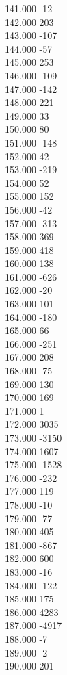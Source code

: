 { 141.000	-12 \\
 142.000	203 \\
 143.000	-107 \\
 144.000	-57 \\
 145.000	253 \\
 146.000	-109 \\
 147.000	-142 \\
 148.000	221 \\
 149.000	33 \\
 150.000	80 \\
 151.000	-148 \\
 152.000	42 \\
 153.000	-219 \\
 154.000	52 \\
 155.000	152 \\
 156.000	-42 \\
 157.000	-313 \\
 158.000	369 \\
 159.000	418 \\
 160.000	138 \\
 161.000	-626 \\
 162.000	-20 \\
 163.000	101 \\
 164.000	-180 \\
 165.000	66 \\
 166.000	-251 \\
 167.000	208 \\
 168.000	-75 \\
 169.000	130 \\
 170.000	169 \\
 171.000	1 \\
 172.000	3035 \\
 173.000	-3150 \\
 174.000	1607 \\
 175.000	-1528 \\
 176.000	-232 \\
 177.000	119 \\
 178.000	-10 \\
 179.000	-77 \\
 180.000	405 \\
 181.000	-867 \\
 182.000	600 \\
 183.000	-16 \\
 184.000	-122 \\
 185.000	175 \\
 186.000	4283 \\
 187.000	-4917 \\
 188.000	-7 \\
 189.000	-2 \\
 190.000	201 \\
}
